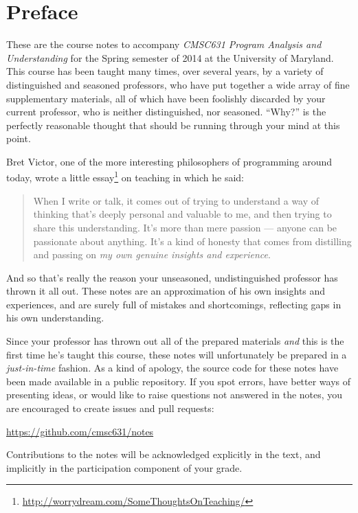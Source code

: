 \section*{Preface}
%

These are the course notes to accompany \emph{CMSC631 Program Analysis
  and Understanding} for the Spring semester of 2014 at the University
of Maryland.
%
This course has been taught many times, over several years, by a
variety of distinguished and seasoned professors, who have put
together a wide array of fine supplementary materials, all of which
have been foolishly discarded by your current professor, who is
neither distinguished, nor seasoned.  ``Why?'' is the perfectly
reasonable thought that should be running through your mind at this
point.

Bret Victor, one of the more interesting philosophers of programming
around today, wrote a little
essay\footnote{\url{http://worrydream.com/SomeThoughtsOnTeaching/}} on
teaching in which he said:
%
\begin{quote}
When I write or talk, it comes out of trying to understand a way of
thinking that's deeply personal and valuable to me, and then trying to
share this understanding. It's more than mere passion --- anyone can
be passionate about anything. It's a kind of honesty that comes from
distilling and passing on \emph{my own genuine insights and
  experience}.
\end{quote}
And so that's really the reason your unseasoned, undistinguished
professor has thrown it all out.  These notes are an approximation of
his own insights and experiences, and are surely full of mistakes and
shortcomings, reflecting gaps in his own understanding.

Since your professor has thrown out all of the prepared materials
\emph{and} this is the first time he's taught this course, these notes
will unfortunately be prepared in a \emph{just-in-time} fashion.  As a
kind of apology, the source code for these notes have been made
available in a public repository.  If you spot errors, have better
ways of presenting ideas, or would like to raise questions not
answered in the notes, you are encouraged to create issues and pull
requests:

\begin{center}
\url{https://github.com/cmsc631/notes}
\end{center}

Contributions to the notes will be acknowledged explicitly in the
text, and implicitly in the participation component of your grade.





